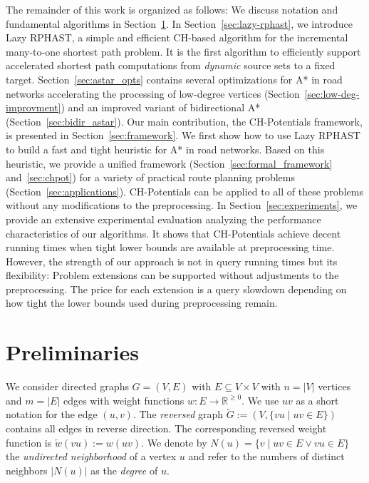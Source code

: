 \documentclass[manuscript]{acmart}
\begin{document}
The remainder of this work is organized as follows:
We discuss notation and fundamental algorithms in Section~\ref{sec:preliminaries}.
In Section~\ref{sec:lazy-rphast}, we introduce Lazy RPHAST, a simple and efficient CH-based algorithm for the incremental many-to-one shortest path problem.
It is the first algorithm to efficiently support accelerated shortest path computations from \emph{dynamic} source sets to a fixed target.
Section~\ref{sec:astar_opts} contains several optimizations for A* in road networks accelerating the processing of low-degree vertices (Section~\ref{sec:low-deg-improvment}) and an improved variant of bidirectional A* (Section~\ref{sec:bidir_astar}).
Our main contribution, the CH-Potentials framework, is presented in Section~\ref{sec:framework}.
We first show how to use Lazy RPHAST to build a fast and tight heuristic for A* in road networks.
Based on this heuristic, we provide a unified framework (Section~\ref{sec:formal_framework} and~\ref{sec:chpot}) for a variety of practical route planning problems (Section~\ref{sec:applications}).
CH-Potentials can be applied to all of these problems without any modifications to the preprocessing.
In Section~\ref{sec:experiments}, we provide an extensive experimental evaluation analyzing the performance characteristics of our algorithms.
It shows that CH-Potentials achieve decent running times when tight lower bounds are available at preprocessing time.
However, the strength of our approach is not in query running times but its flexibility:
Problem extensions can be supported without adjustments to the preprocessing.
The price for each extension is a query slowdown depending on how tight the lower bounds used during preprocessing remain.

\section{Preliminaries}\label{sec:preliminaries}

We consider directed graphs $G=(V,E)$ with $E \subseteq V \times V$ with $n=|V|$ vertices and $m=|E|$ edges with weight functions $w : E \to \mathbb{R}^{\geq 0}$.
We use $uv$ as a short notation for the edge $(u,v)$.
The \emph{reversed} graph $\overleftarrow{G} := (V, \{ vu \mid uv \in E \})$ contains all edges in reverse direction.
The corresponding reversed weight function is $\overleftarrow{w}(vu) := w(uv)$.
We denote by $N(u) = \{ v \mid uv \in E \vee vu \in E \}$ the \emph{undirected neighborhood} of a vertex $u$ and refer to the numbers of distinct neighbors $|N(u)|$ as the \emph{degree} of $u$.
\end{document}
